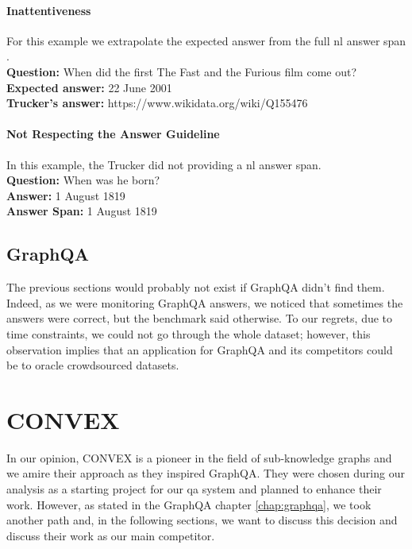 \paragraph{Inattentiveness} 
For this example we extrapolate the expected answer from the full \gls{nl} answer span . \\
\textbf{Question:} When did the first The Fast and the Furious film come out? \\
\textbf{Expected answer:} 22 June 2001 \\
\textbf{Trucker's answer:} https://www.wikidata.org/wiki/Q155476\\

\paragraph{Not Respecting the Answer Guideline} 
In this example, the Trucker did not providing a \gls{nl} answer span. \\
\textbf{Question:} When was he born? \\
\textbf{Answer:} 1 August 1819 \\
\textbf{Answer Span:} 1 August 1819 \\


\subsection{GraphQA}
The previous sections would probably not exist if GraphQA didn't find them. Indeed, as we were monitoring GraphQA answers, we noticed that sometimes the answers were correct, but the benchmark said otherwise. To our regrets, due to time constraints, we could not go through the whole dataset; however, this observation implies that an application for GraphQA and its competitors could be to \gls{oracle} crowdsourced datasets.


\section{CONVEX}
In our opinion, CONVEX is a pioneer in the field of sub-knowledge graphs and we amire their approach as they inspired  GraphQA. They were chosen during our analysis as a starting project for our \gls{qa} system and planned to enhance their work. However, as stated in the GraphQA chapter \ref{chap:graphqa}, we took another path and, in the following sections, we want to discuss this decision and discuss their work as our main competitor.

